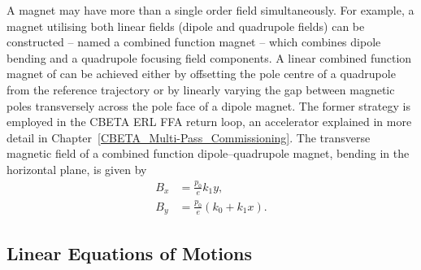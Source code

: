 \documentclass[../main.tex]{subfiles}
\begin{document}
A magnet may have more than a single order field simultaneously. For example, a magnet utilising both linear fields (dipole and quadrupole fields) can be constructed -- named a combined function magnet -- which combines dipole bending and a quadrupole focusing field components. A linear combined function magnet of can be achieved either by offsetting the pole centre of a quadrupole from the reference trajectory or by linearly varying the gap between magnetic poles transversely across the pole face of a dipole magnet. The former strategy is employed in the CBETA ERL FFA return loop, an accelerator explained in more detail in Chapter~\ref{CBETA_Multi-Pass_Commissioning}. The transverse magnetic field of a combined function dipole--quadrupole magnet, bending in the horizontal plane, is given by 
\begin{align}
B_{x} &= \frac{p_{0}}{e}k_{1}y, \nonumber\\
B_{y} &= \frac{p_{0}}{e}\left(k_{0}+k_{1}x\right).
\label{eq:combined_function_field}    
\end{align}

\subsection{Linear Equations of Motions}
\label{sec:equations_of_motion}
\end{document}
